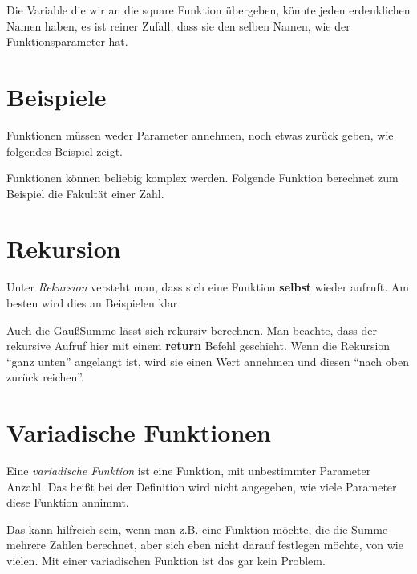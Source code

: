 \documentclass[c_worksheet.tex]{subfiles}
\begin{document}
Die Variable die wir an die square Funktion übergeben, könnte jeden erdenklichen Namen haben, es ist reiner Zufall, dass sie den selben Namen, wie der Funktionsparameter hat.



\section{Beispiele}

Funktionen müssen weder Parameter annehmen, noch etwas zurück geben, wie folgendes Beispiel zeigt.

  

Funktionen können beliebig komplex werden. Folgende Funktion berechnet zum Beispiel die Fakultät einer Zahl.

 



\section{Rekursion}

Unter \emph{Rekursion} versteht man, dass sich eine Funktion \textbf{selbst} wieder aufruft. Am besten wird dies an Beispielen klar



Auch die GaußSumme lässt sich rekursiv berechnen. Man beachte, dass der rekursive Aufruf hier mit einem \textbf{return} Befehl geschieht. Wenn die Rekursion ``ganz unten'' angelangt ist, wird sie einen Wert annehmen und diesen ``nach oben zurück reichen''.


 



\section{Variadische Funktionen}

Eine \emph{variadische Funktion} ist eine Funktion, mit unbestimmter Parameter Anzahl. Das heißt bei der Definition wird nicht angegeben, wie viele Parameter diese Funktion annimmt.

Das kann hilfreich sein, wenn man z.B. eine Funktion möchte, die die Summe mehrere Zahlen berechnet, aber sich eben nicht darauf festlegen möchte, von wie vielen. Mit einer variadischen Funktion ist das gar kein Problem.
\end{document}
